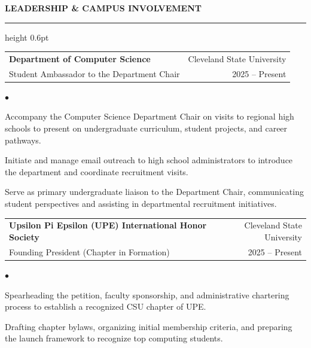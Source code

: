 \documentclass[letterpaper,10pt]{article}
\makeatletter
\newcommand{\resumesection}[1]{%
  \vspace{4pt}%
  {\large\textbf{\uppercase{#1}}}%
  \vspace{1pt}\hrule height 0.6pt\vspace{3pt}%
}
\newenvironment{resumelist}{%
  \begin{list}{$\bullet$}{%
    \setlength{\leftmargin}{1.2em}%
    \setlength{\itemsep}{1pt}%
    \setlength{\parsep}{0pt}%
    \setlength{\topsep}{1.5pt}%
    \setlength{\partopsep}{0pt}%
  }%
}{%
  \end{list}%
}
\newcommand{\resumeSubheading}[4]{%
  \vspace{2pt}%
  \begin{tabular*}{1.0\textwidth}[t]{l@{\extracolsep{\fill}}r}%
    \textbf{#1} & #2 \\%
    \small #3 & \small #4 \\%
  \end{tabular*}\vspace{-1pt}%
}
\makeatother
\begin{document}
\resumesection{Leadership \& Campus Involvement}

  \resumeSubheading
    {Department of Computer Science}{Cleveland State University}
    {Student Ambassador to the Department Chair}{2025 -- Present}
    \begin{resumelist}
      \item \small{Accompany the Computer Science Department Chair on visits to regional high schools to present on undergraduate curriculum, student projects, and career pathways.}
      \item \small{Initiate and manage email outreach to high school administrators to introduce the department and coordinate recruitment visits.}
      \item \small{Serve as primary undergraduate liaison to the Department Chair, communicating student perspectives and assisting in departmental recruitment initiatives.}
    \end{resumelist}

  \resumeSubheading
    {Upsilon Pi Epsilon (UPE) International Honor Society}{Cleveland State University}
    {Founding President (Chapter in Formation)}{2025 -- Present}
    \begin{resumelist}
      \item \small{Spearheading the petition, faculty sponsorship, and administrative chartering process to establish a recognized CSU chapter of UPE.}
      \item \small{Drafting chapter bylaws, organizing initial membership criteria, and preparing the launch framework to recognize top computing students.}
    \end{resumelist}
\end{document}
